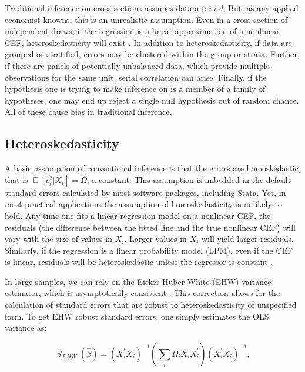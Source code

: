 \documentclass[11pt]{article}
\DeclareMathOperator{\E}{\mathbb{E}}
\DeclareMathOperator{\V}{\mathbb{V}}
\begin{document}
Traditional inference on cross-sections assumes data are \emph{i.i.d.} But, as any applied economist knowns, this is an unrealistic assumption. Even in a cross-section of independent draws, if the regression is a linear approximation of a nonlinear CEF, heteroskedasticity will exist \citep{angrist_mostly_2009}. In addition to heteroskedasticity, if data are grouped or stratified, errors may be clustered within the group or strata. Further, if there are panels of potentially unbalanced data, which provide multiple observations for the same unit, serial correlation can arise. Finally, if the hypothesis one is trying to make inference on is a member of a family of hypotheses, one may end up reject a single null hypothesis out of random chance. All of these cause bias in traditional inference.


\subsection{Heteroskedasticity}

A basic assumption of conventional inference is that the errors are homoskedastic, that is $\E[\epsilon_i^2 | X_i] = \Omega$, a constant. This assumption is imbedded in the default standard errors calculated by most software packages, including Stata. Yet, in most practical applications the assumption of homoskedasticity is unlikely to hold. Any time one fits a linear regression model on a nonlinear CEF, the residuals (the difference between the fitted line and the true nonlinear CEF) will vary with the size of values in $X_i$. Larger values in $X_i$ will yield larger residuals. Similarly, if the regression is a linear probability model (LPM), even if the CEF is linear, residuals will be heteroskedastic unless the regressor is constant \citep{angrist_mostly_2009}.

In large samples, we can rely on the Eicker-Huber-White (EHW) variance estimator, which is asymptotically consistent \citep{eicker_limit_1967, huber_behavior_1967, white_heteroskedasticity-consistent_1980}. This correction allows for the calculation of standard errors that are robust to heteroskedasticity of unspecified form. To get EHW robust standard errors, one simply estimates the OLS variance as:

\begin{equation}
    \V_{EHW} \left( \hat{\beta} \right) = \left( X_{i}^{'} X_{i} \right)^{-1} \left( \sum_{i} \Omega_{i} X_{i} X_{i}^{'} \right) \left( X_{i}^{'} X_{i} \right)^{-1},
\end{equation}
\end{document}
